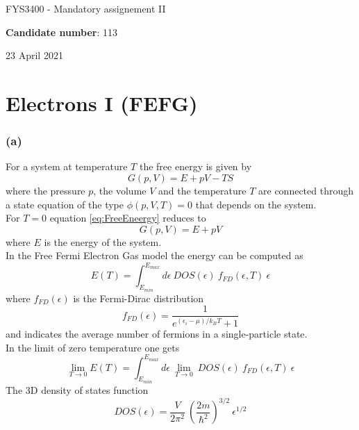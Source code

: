 \documentclass{article}
\begin{document}
\begin{center}
    \centerline{\LARGE FYS3400 - Mandatory assignement II}
    \vspace{10pt}
    \centerline{\large\textbf{Candidate number}: 113}
    \vspace{10pt}
    \centerline{23 April 2021}
\end{center}

\section{Electrons I (FEFG)}

\subsubsection*{(a)}
For a system at temperature $T$ the free energy is given by 
\begin{equation}
    G(p, V) = E + pV - TS
    \label{eq:FreeEneergy}
\end{equation}
where the pressure $p$, the volume $V$ and the temperature $T$ are connected through a state equation of the type $\phi(p, V, T) = 0$ that depends
on the system. \\
For $T=0$ equation \ref{eq:FreeEneergy} reduces to
\begin{equation}
    G(p, V) = E + pV
\end{equation}
where $E$ is the energy of the system. \\
In the Free Fermi Electron Gas model the energy can be computed as
\begin{equation}
    E(T) = \int_{E_{min}}^{E_{max}} d\epsilon \ DOS(\epsilon) \ f_{FD}(\epsilon, T) \ \epsilon 
\end{equation}
where $f_{FD}(\epsilon)$ is the Fermi-Dirac distribution 
\begin{equation*}
    f_{FD}(\epsilon) = \frac{1}{e^{(\epsilon_i - \mu)/k_B T} + 1}
\end{equation*}
and indicates the average number of fermions in a single-particle state. \\
In the limit of zero temperature one gets
\begin{equation}
    \lim_{T \to 0} E(T) = \int_{E_{min}}^{E_{max}} d\epsilon \ \lim_{T \to 0} \ DOS(\epsilon) \ f_{FD}(\epsilon, T) \ \epsilon
    \label{eq:energy_FEFG}
\end{equation}
The 3D density of states function 
\begin{equation}
    DOS(\epsilon) = \frac{V}{2\pi^2} \ \left(\frac{2m}{\hbar^2}\right)^{3/2} \ \epsilon^{1/2}
\end{equation}
\end{document}
